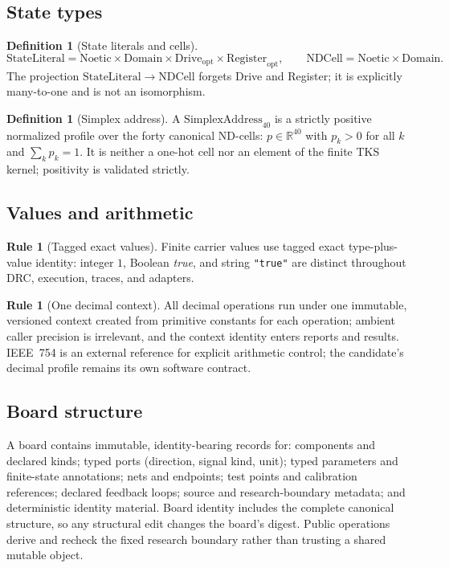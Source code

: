 \documentclass[11pt]{amsart}
\theoremstyle{definition}
\newtheorem{definition}[theorem]{Definition}
\newtheorem{ruleenv}[theorem]{Rule}
\theoremstyle{remark}
\begin{document}
\subsection{State types}

\begin{definition}[State literals and cells]\label{def:states}
\[
\mathrm{StateLiteral}=\mathrm{Noetic}\times\mathrm{Domain}\times\mathrm{Drive}_{\mathrm{opt}}\times\mathrm{Register}_{\mathrm{opt}},
\qquad
\mathrm{NDCell}=\mathrm{Noetic}\times\mathrm{Domain}.
\]
The projection $\mathrm{StateLiteral}\to\mathrm{NDCell}$ forgets Drive and Register; it is explicitly many-to-one and is not an isomorphism.
\end{definition}

\begin{definition}[Simplex address]\label{def:simplex}
A $\mathrm{SimplexAddress}_{40}$ is a strictly positive normalized profile over the forty canonical ND-cells: $p\in\mathbb{R}^{40}$ with $p_k>0$ for all $k$ and $\sum_kp_k=1$. It is neither a one-hot cell nor an element of the finite TKS kernel; positivity is validated strictly.
\end{definition}

\subsection{Values and arithmetic}

\begin{ruleenv}[Tagged exact values]\label{rule:tagged}
Finite carrier values use tagged exact type-plus-value identity: integer $1$, Boolean \emph{true}, and string \texttt{"true"} are distinct throughout DRC, execution, traces, and adapters.
\end{ruleenv}

\begin{ruleenv}[One decimal context]\label{rule:decimal}
All decimal operations run under one immutable, versioned context created from primitive constants for each operation; ambient caller precision is irrelevant, and the context identity enters reports and results. IEEE~754 \cite{ieee754} is an external reference for explicit arithmetic control; the candidate's decimal profile remains its own software contract.
\end{ruleenv}

\subsection{Board structure}
A board contains immutable, identity-bearing records for: components and declared kinds; typed ports (direction, signal kind, unit); typed parameters and finite-state annotations; nets and endpoints; test points and calibration references; declared feedback loops; source and research-boundary metadata; and deterministic identity material. Board identity includes the complete canonical structure, so any structural edit changes the board's digest. Public operations derive and recheck the fixed research boundary rather than trusting a shared mutable object.
\end{document}
